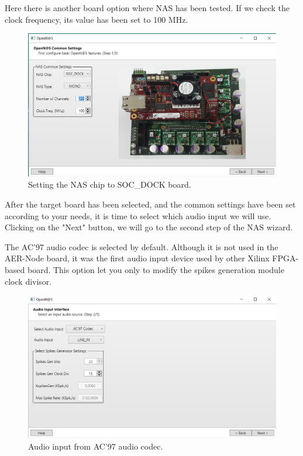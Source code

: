 Here there is another board option where NAS has been tested. If we check the clock frequency, its value has been set to 100 MHz.

\begin{figure}[H]
\centering
\includegraphics[width=1\textwidth]{images/Img15_VS_Step1_bis.PNG}
\caption{\label{fig:OpenNAS_s1}Setting the NAS chip to SOC\_DOCK board.}
\end{figure}

After the target board has been selected, and the common settings have been set according to your needs, it is time to select which audio input we will use. Clicking on the "Next" button, we will go to the second step of the NAS wizard.

The AC'97 audio codec is selected by default. Although it is not used in the AER-Node board, it was the first audio input device used by other Xilinx FPGA-based board. This option let you only to modify the spikes generation module clock divisor.

\begin{figure}[H]
\centering
\includegraphics[width=1\textwidth]{images/Img16_S2_SelectInput.PNG}
\caption{\label{fig:OpenNAS_s2_ac97}Audio input from AC'97 audio codec.}
\end{figure}


